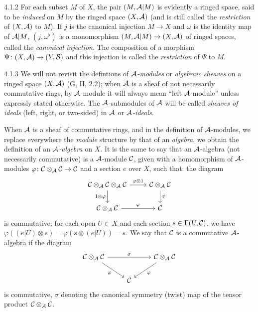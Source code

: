 \documentclass[../main.tex]{subfiles}
\begin{document}
\begin{env}{4.1.2}
For each subset $M$ of $X$, the pair $(M,\mathcal{A}|M)$ is evidently a ringed space, said
to be \emph{induced} on $M$ by the ringed space $(X,\mathcal{A})$ (and is still called
the \emph{restriction} of $(X,\mathcal{A})$ to $M$). If $j$ is the canonical injection
$M\to X$ and $\omega$ is the identity map of $\mathcal{A}|M$, $(j,\omega^\flat)$ is a
monomorphism $(M,\mathcal{A}|M)\to(X,\mathcal{A})$ of ringed spaces, called the
\emph{canonical injection}. The composition of a morphism
$\Psi\colon(X,\mathcal{A})\to(Y,\mathcal{B})$ and this injection is called the \emph{restriction}
of $\Psi$ to $M$.
\end{env}

\begin{env}{4.1.3}
We will not revisit the defintions of \emph{$\mathcal{A}$-modules} or
\emph{algebraic sheaves} on a ringed space $(X,\mathcal{A})$ (G, II, 2.2);
when $\mathcal{A}$ is a sheaf of not necessarily commutative rings, by $\mathcal{A}$-module
it will always mean ``left $\mathcal{A}$-module'' unless expressly stated otherwise. The
$\mathcal{A}$-submodules of $\mathcal{A}$ will be called \emph{sheaves of ideals} (left,
right, or two-sided) in $\mathcal{A}$ or \emph{$\mathcal{A}$-ideals}.

When $\mathcal{A}$ is a sheaf of commutative rings, and in the definition of
$\mathcal{A}$-modules, we replace everywhere the \emph{module} structure by that of
an \emph{algebra}, we obtain the definition of an \emph{$\mathcal{A}$-algebra} on $X$.
It is the same to say that an $\mathcal{A}$-algebra (not necessarily commutative) is
a $\mathcal{A}$-module $\mathcal{C}$, given with a homomorphism of $\mathcal{A}$-modules
$\varphi\colon\mathcal{C}\otimes_{\mathcal{A}}\mathcal{C}\to\mathcal{C}$ and a section $e$ over $X$,
such that:  the diagram
\[
  \begin{tikzcd}
    \sheaf{C}\otimes_{\sheaf{A}}\sheaf{C}\otimes_{\sheaf{A}}\sheaf{C}
    \ar[r,"\varphi\otimes 1"]\ar[d,"1\otimes\varphi"'] &
    \sheaf{C}\otimes_{\sheaf{A}}\sheaf{C}\ar[d,"\varphi"]\\
    \sheaf{C}\otimes_{\sheaf{A}}\sheaf{C}\ar[r,"\varphi"] & \sheaf{C}
  \end{tikzcd}
\]
is commutative;  for each open $U\subset X$ and each section $s\in\Gamma(U,\mathcal{C})$,
we have $\varphi((e|U)\otimes s)=\varphi(s\otimes(e|U))=s$. We say that $\mathcal{C}$ is a
commutative $\mathcal{A}$-algebra if the diagram
\[
  \begin{tikzcd}
    \sheaf{C}\otimes_{\sheaf{A}}\sheaf{C}\ar[rr,"\sigma"]\ar[rd,"\varphi"']
    & & \sheaf{C}\otimes_{\sheaf{A}}\sheaf{C}\ar[ld,"\varphi"]\\
   & \sheaf{C}
  \end{tikzcd}
\]
is commutative, $\sigma$ denoting the canonical symmetry (twist) map of the tensor product
$\mathcal{C}\otimes_{\mathcal{A}}\mathcal{C}$.


\end{env}
\end{document}
